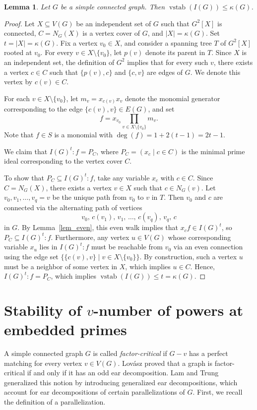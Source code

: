 \documentclass[12pt,reqno,twoside]{amsart}
\newtheorem{lem}[thm]{\bf Lemma}
\theoremstyle{definition}
\theoremstyle{plain}
\theoremstyle{remark}
\numberwithin{equation}{section}
\begin{document}
\begin{lem}\label{lem_kappa_2} 
Let $G$ be a simple connected graph. Then $\operatorname{vstab}(I(G)) \le \kappa(G)$.
\end{lem}

\begin{proof}
Let $X \subseteq V(G)$ be an independent set of $G$ such that $G^2[X]$ is connected, $C = N_G(X)$ is a vertex cover of $G$, and $|X| = \kappa(G)$. Set $t = |X| = \kappa(G)$. Fix a vertex $v_0 \in X$, and consider a spanning tree $T$ of $G^2[X]$ rooted at $v_0$. For every $v \in X \setminus \{v_0\}$, let $p(v)$ denote its parent in $T$. Since $X$ is an independent set, the definition of $G^2$ implies that for every such $v$, there exists a vertex $c \in C$ such that $\{p(v), c\}$ and $\{c, v\}$ are edges of $G$. We denote this vertex by $c(v) \in C$. 

For each $v \in X \setminus \{v_0\}$, let $m_v = x_{c(v)} x_v$ denote the monomial generator corresponding to the edge $\{c(v), v\} \in E(G)$, and set 
\[
f = x_{v_0} \prod_{v \in X \setminus \{v_0\}} m_v.
\]
Note that $f \in S$ is a monomial with $\deg(f) = 1 + 2(t - 1) = 2t - 1$.

We claim that $I(G)^t : f = P_C$, where $P_C = (x_c \mid c \in C)$ is the minimal prime ideal corresponding to the vertex cover $C$. 

To show that $P_C \subseteq I(G)^t : f$, take any variable $x_c$ with $c \in C$. Since $C = N_G(X)$, there exists a vertex $v \in X$ such that $c \in N_G(v)$. Let $v_0, v_1, \ldots, v_q = v$ be the unique path from $v_0$ to $v$ in $T$. Then $v_0$ and $c$ are connected via the alternating path of vertices
\[
v_0, \, c(v_1), \, v_1, \, \ldots, \, c(v_q), \, v_q, \, c
\]
in $G$. By Lemma~\ref{lem_even}, this even walk implies that $x_c f \in I(G)^t$, so $P_C \subseteq I(G)^t : f$. Furthermore, any vertex $u \in V(G)$ whose corresponding variable $x_u$ lies in $I(G)^t : f$ must be reachable from $v_0$ via an even connection using the edge set $\{\{c(v),v\} \mid v \in X \setminus \{v_0\}\}$. By construction, such a vertex $u$ must be a neighbor of some vertex in $X$, which implies $u \in C$. Hence, $I(G)^t : f = P_C$, which implies $\operatorname{vstab}(I(G)) \le t = \kappa(G)$.
\end{proof}

\section{Stability of $v$-number of powers at embedded primes}\label{sec_embedded}
A simple connected graph $G$ is called \emph{factor-critical} if $G - v$ has a perfect matching for every vertex $v \in V(G)$. Lov\'asz \cite{L} proved that a graph is factor-critical if and only if it has an odd ear decomposition. Lam and Trung \cite{LT} generalized this notion by introducing generalized ear decompositions, which account for ear decompositions of certain parallelizations of $G$. First, we recall the definition of a parallelization.
\end{document}
